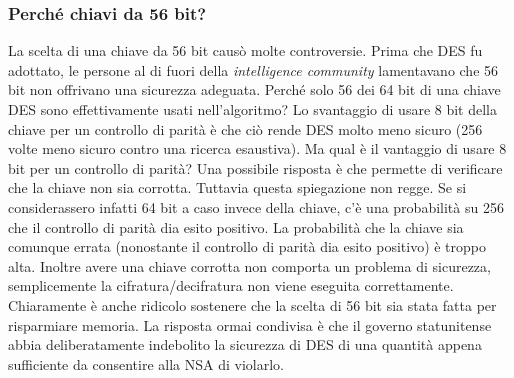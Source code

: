 \subsubsection{Perché chiavi da 56 bit?}
La scelta di una chiave da 56 bit causò molte controversie. Prima che DES fu adottato, le persone al di fuori della \textit{intelligence community} lamentavano che 56 bit non offrivano una sicurezza adeguata. Perché solo 56 dei 64 bit di una chiave DES sono effettivamente usati nell'algoritmo? Lo svantaggio di usare 8 bit della chiave per un controllo di parità è che ciò rende DES molto meno sicuro (256 volte meno sicuro contro una ricerca esaustiva). Ma qual è il vantaggio di usare 8 bit per un controllo di parità? Una possibile risposta è che permette di verificare che la chiave non sia corrotta. Tuttavia questa spiegazione non regge. Se si considerassero infatti 64 bit a caso invece della chiave, c'è una probabilità su 256 che il controllo di parità dia esito positivo. La probabilità che la chiave sia comunque errata (nonostante il controllo di parità dia esito positivo) è troppo alta. Inoltre avere una chiave corrotta non comporta un problema di sicurezza, semplicemente la cifratura/decifratura non viene eseguita correttamente. Chiaramente è anche ridicolo sostenere che la scelta di 56 bit sia stata fatta per risparmiare memoria. \newline La risposta ormai condivisa è che il governo statunitense abbia deliberatamente indebolito la sicurezza di DES di una quantità appena sufficiente da consentire alla NSA di violarlo.

